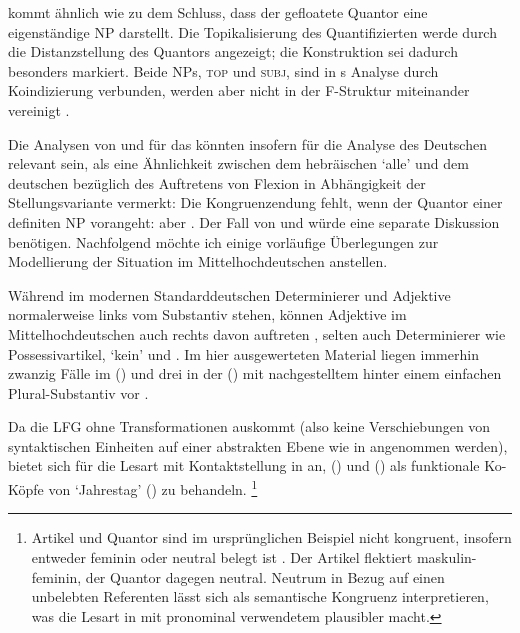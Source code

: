 \citet[533--534]{spector2009} kommt ähnlich wie \citet[29]{pittner1995} zu dem
Schluss, dass der gefloatete Quantor eine eigenständige NP darstellt. Die
Topikalisierung des Quantifizierten werde durch die Distanzstellung des
Quantors angezeigt; die Konstruktion sei dadurch besonders markiert. Beide NPs,
\textsc{top} und \textsc{subj}, sind in \citeauthor{spector2009}s Analyse durch
Koindizierung verbunden, werden aber nicht in der F-Struktur miteinander
vereinigt \autocite[vgl.][99]{bresnanetal2016}.

Die Analysen von \citet{shlonsky1991} und \citet{spector2009} für das
 könnten insofern für die Analyse des Deutschen relevant sein, als
\citet[179]{merchant1996} eine Ähnlichkeit zwischen dem hebräischen 
`alle' und dem deutschen  bezüglich des Auftretens von Flexion in
Abhängigkeit der Stellungsvariante vermerkt: Die Kongruenzendung fehlt, wenn
der Quantor einer definiten NP vorangeht:  aber . Der
Fall von  und  würde eine separate Diskussion
benötigen. Nachfolgend möchte ich einige vorläufige Überlegungen zur
Modellierung der Situation im Mittelhochdeutschen
anstellen.

Während im modernen Standarddeutschen Determinierer und Adjektive normalerweise
links vom Substantiv stehen, können Adjektive im
Mittelhochdeutschen auch rechts davon auftreten
\autocite[185--186, 237--243]{ksw2}, selten auch Determinierer wie
Possessivartikel,  `kein' und 
\autocite[515--517, 551--552, 623--624]{ksw2}. Im hier ausgewerteten Material
liegen immerhin zwanzig Fälle im 
(\CAO) und drei in der  (\KC) mit nachgestelltem
 hinter einem einfachen Plural-Substantiv vor
.



Da die LFG ohne Transformationen auskommt (also keine Verschiebungen von
syntaktischen Einheiten auf einer abstrakten Ebene wie in 
angenommen werden), bietet sich für die Lesart mit Kontaktstellung in
 an,  () und 
() als funktionale Ko-Köpfe von  `Jahrestag' ()
zu behandeln.%
%
	\footnote{Artikel und Quantor sind im ursprünglichen Beispiel nicht
		kongruent, insofern  entweder feminin oder neutral belegt
		ist \autocite[s.\,v.~]{lexer:mhdhwb}. Der Artikel 
		flektiert maskulin-feminin, der Quantor  dagegen neutral.
		Neutrum in Bezug auf einen unbelebten Referenten lässt sich als
		semantische Kongruenz interpretieren, was die Lesart in
		 mit pronominal verwendetem 
		plausibler macht.}

